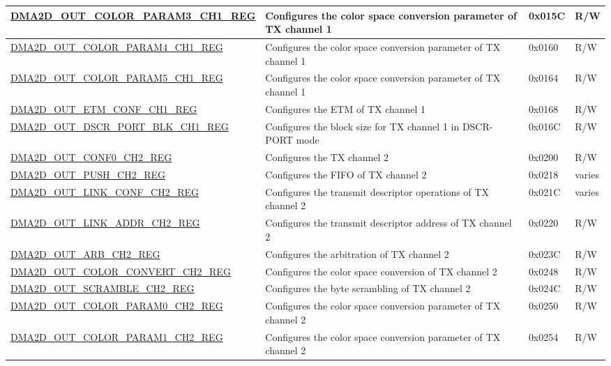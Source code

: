 \begin{longtable}{ | p{7cm} | p{11.5cm} | p{1.3cm} | p{2cm} | }
\hyperref[regdesc:DMA2DOUTCOLORPARAM3CHNREG]{DMA2D\_OUT\_COLOR\_PARAM3\_CH1\_REG} & Configures the color space conversion parameter of TX channel 1 & 0x015C & R/W \\ \hline
\hyperref[regdesc:DMA2DOUTCOLORPARAM4CHNREG]{DMA2D\_OUT\_COLOR\_PARAM4\_CH1\_REG} & Configures the color space conversion parameter of TX channel 1 & 0x0160 & R/W \\ \hline
\hyperref[regdesc:DMA2DOUTCOLORPARAM5CHNREG]{DMA2D\_OUT\_COLOR\_PARAM5\_CH1\_REG} & Configures the color space conversion parameter of TX channel 1 & 0x0164 & R/W \\ \hline
\hyperref[regdesc:DMA2DOUTETMCONFCHNREG]{DMA2D\_OUT\_ETM\_CONF\_CH1\_REG} & Configures the ETM of TX channel 1 & 0x0168 & R/W \\ \hline
\hyperref[regdesc:DMA2DOUTDSCRPORTBLKCHNREG]{DMA2D\_OUT\_DSCR\_PORT\_BLK\_CH1\_REG} & Configures the block size for TX channel 1 in DSCR-PORT mode & 0x016C & R/W \\ \hline
\hyperref[regdesc:DMA2DOUTCONF0CHNREG]{DMA2D\_OUT\_CONF0\_CH2\_REG} & Configures the TX channel 2 & 0x0200 & R/W \\ \hline
\hyperref[regdesc:DMA2DOUTPUSHCHNREG]{DMA2D\_OUT\_PUSH\_CH2\_REG} & Configures the FIFO of TX channel 2 & 0x0218 & varies \\ \hline
\hyperref[regdesc:DMA2DOUTLINKCONFCHNREG]{DMA2D\_OUT\_LINK\_CONF\_CH2\_REG} & Configures the transmit descriptor operations of TX channel 2 & 0x021C & varies \\ \hline
\hyperref[regdesc:DMA2DOUTLINKADDRCHNREG]{DMA2D\_OUT\_LINK\_ADDR\_CH2\_REG} & Configures the transmit descriptor address of TX channel 2 & 0x0220 & R/W \\ \hline
\hyperref[regdesc:DMA2DOUTARBCHNREG]{DMA2D\_OUT\_ARB\_CH2\_REG} & Configures the arbitration of TX channel 2 & 0x023C & R/W \\ \hline
\hyperref[regdesc:DMA2DOUTCOLORCONVERTCHNREG]{DMA2D\_OUT\_COLOR\_CONVERT\_CH2\_REG} & Configures the color space conversion of TX channel 2 & 0x0248 & R/W \\ \hline
\hyperref[regdesc:DMA2DOUTSCRAMBLECHNREG]{DMA2D\_OUT\_SCRAMBLE\_CH2\_REG} & Configures the byte scrambling of TX channel 2 & 0x024C & R/W \\ \hline
\hyperref[regdesc:DMA2DOUTCOLORPARAM0CHNREG]{DMA2D\_OUT\_COLOR\_PARAM0\_CH2\_REG} & Configures the color space conversion parameter of TX channel 2 & 0x0250 & R/W \\ \hline
\hyperref[regdesc:DMA2DOUTCOLORPARAM1CHNREG]{DMA2D\_OUT\_COLOR\_PARAM1\_CH2\_REG} & Configures the color space conversion parameter of TX channel 2 & 0x0254 & R/W \\ \hline

\end{longtable}
